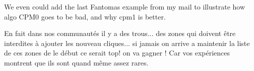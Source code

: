 \documentclass[a4paper,12pt]{article}
\begin{document}
{\color{red} We even could add the last Fantomas example 
from my mail to illustrate how algo CPM0 goes to be bad,
and why cpm1 is better.}

{\color{red}

En fait dans nos communautés il y a des trous...
des zones qui doivent
être interdites
à ajouter les nouveau cliques... 
si jamais on arrive a maintenir
la liste de ces zones de le début ce serait top!
on va gagner ! Car vos expériences montrent que ils sont quand même assez rares.

}



\end{document}
